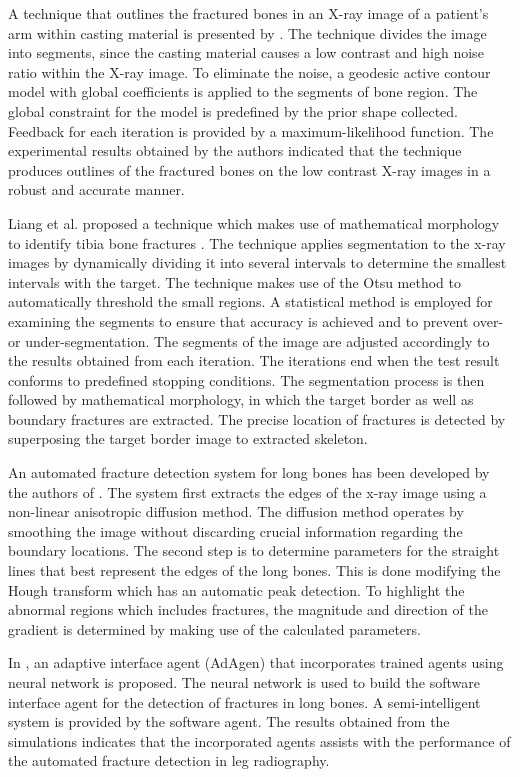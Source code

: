 \documentclass[11pt]{article}
\begin{document}
	A technique that outlines the fractured bones in an X-ray image of a patient's arm within casting material is presented by \cite{Jia_Jiang2006}. The technique divides the image into segments, since the casting material causes a low contrast and high noise ratio within the X-ray image. To eliminate the noise, a geodesic active contour model with global coefficients is applied to the segments of bone region. The global constraint for the model is predefined by the prior shape collected. Feedback for each iteration is provided by a maximum-likelihood function. The experimental results obtained by the authors indicated that the technique produces outlines of the fractured bones on the low contrast X-ray images in a robust and accurate manner.
	
	Liang et al. proposed a technique which makes use of mathematical morphology to identify tibia bone fractures \cite{Liang_Pan_Huang_Fan_2010}. The technique applies segmentation to the x-ray images by dynamically dividing it into several intervals to determine the smallest intervals with the target. The technique makes use of the Otsu method to automatically threshold the small regions. A statistical method is employed for examining the segments to ensure that accuracy is achieved and to prevent over- or under-segmentation. The segments of the image are adjusted accordingly to the results obtained from each iteration. The iterations end when the test result conforms to predefined stopping conditions. The segmentation process is then followed by mathematical morphology, in which the target border as well as boundary fractures are extracted. The precise location of fractures is detected by superposing the target border image to extracted skeleton.
	
	An automated fracture detection system for long bones has been developed by the authors of \cite{Donnelley2005}. The system first extracts the edges of the x-ray image using a non-linear anisotropic diffusion method. The diffusion method operates by smoothing the image without discarding crucial information regarding the boundary locations. The second step is to determine parameters for the straight lines that best represent the edges of the long bones. This is done modifying the Hough transform which has an automatic peak detection. To highlight the abnormal regions which includes fractures, the magnitude and direction of the gradient is determined by making use of the calculated parameters.
	
	In \cite{Syiam_Aziem_Soliman2004}, an adaptive interface agent (AdAgen) that incorporates trained agents using neural network is proposed. The neural network is used to build the software interface agent for the detection of fractures in long bones. A semi-intelligent system is provided by the software agent. The results obtained from the simulations indicates that the incorporated agents assists with the performance of the automated fracture detection in leg radiography.
	
\end{document}
